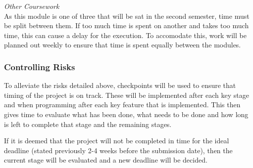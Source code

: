 \documentclass[11pt,a4paper]{article}
\begin{document}
\textit{Other Coursework}\\
As this module is one of three that will be sat in the second semester, time must be split between them. If too much time is spent on another and takes too much time, this can cause a delay for the execution. To accomodate this, work will be planned out weekly to ensure that time is spent equally between the modules.\\

\subsubsection{Controlling Risks}

To alleviate the risks detailed above, checkpoints will be used to ensure that timing of the project is on track. These will be implemented after each key stage and when programming after each key feature that is implemented. This then gives time to evaluate what has been done, what needs to be done and how long is left to complete that stage and the remaining stages.

If it is deemed that the project will not be completed in time for the ideal deadline (stated previously 2-4 weeks before the submission date), then the current stage will be evaluated and a new deadline will be decided. 




\end{document}
